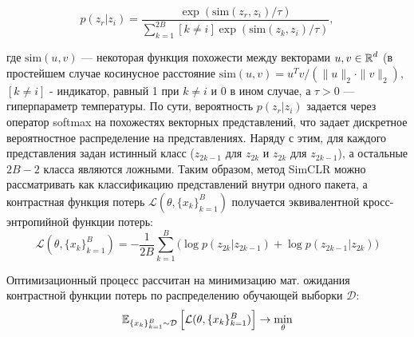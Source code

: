 \begin{equation}
    p(z_r|z_i) = \frac{\exp(\text{sim}(z_r, z_i)/\tau)}{\sum_{k=1}^{2B} [k \ne i] \exp(\text{sim}(z_k, z_i)/\tau)},
\end{equation}

\noindent
где $\text{sim}(u, v)$ --- некоторая функция похожести между векторами $u, v \in \operatorname{\mathbb{R}}^d$ (в простейшем случае косинусное расстояние $\text{sim}(u, v) = u^T v /(\|u\|_2 \cdot \|v\|_2)$, $[k \ne i]$ - индикатор, равный 1 при $k \ne i$ и 0 в ином случае, а $\tau > 0$ --- гиперпараметр температуры. По сути, вероятность $p(z_r|z_i)$ задается через оператор softmax на похожестях векторных представлений, что задает дискретное вероятностное распределение на представлениях. Наряду с этим, для каждого представления задан истинный класс ($z_{2k-1}$ для $z_{2k}$ и $z_{2k}$ для $z_{2k-1}$), а остальные $2B-2$ класса являются ложными. Таким образом, метод SimCLR можно рассматривать как классификацию представлений внутри одного пакета, а контрастная функция потерь $\mathcal{L}(\theta, \{x_k\}_{k=1}^B)$ получается эквивалентной кросс-энтропийной функции потерь:
\begin{equation}
    \mathcal{L}(\theta, \{x_k\}_{k=1}^B) = -\frac{1}{2B} \sum_{k=1}^B \Big(\log p(z_{2k}|z_{2k-1}) + \log p(z_{2k-1}|z_{2k})\Big)
\end{equation}

\noindent
Оптимизационный процесс рассчитан на минимизацию мат. ожидания контрастной функции потерь по распределению обучающей выборки $\mathcal{D}$:
\begin{equation}
    \operatorname{\mathbb{E}}_{\{x_k\}_{k=1}^B \sim \mathcal{D}} \Big[ \mathcal{L}(\theta, \{x_k\}_{k=1}^B) \Big] \rightarrow \min_{\theta}
\end{equation}
